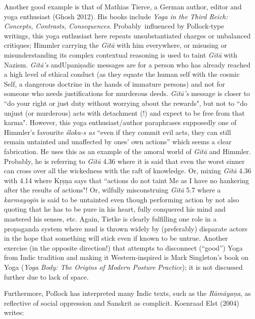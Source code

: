 Another good example is that of Mathias Tierce, a German author, editor and yoga enthusiast (Ghosh 2012). His books include {\sl Yoga in the Third Reich: Concepts, Contrasts, Consequences}. Probably~influenced by Pollock-type writings, this yoga enthusiast here repeats unsubstantiated charges or unbalanced critiques; Himmler carrying the {\sl Gītā} with him everywhere, or misusing or misunderstanding its complex contextual reasoning is used to taint {\sl Gītā} with Nazism. {\sl Gītā's} and\break Upaniṣadic messages are for a person who has already reached a high level of ethical conduct (as they equate the human self with the cosmic Self, a dangerous doctrine in the hands of immature persons) and not for someone who needs justifications for murderous deeds. {\sl Gītā's} message is closer to ``do your right or just duty without worrying about the rewards", but not to ``do unjust (or murderous) acts with detachment (!) and expect to be free from that karma". However, this yoga enthusiast/author paraphrases supposedly one of Himmler's favourite {\sl śloka-s as} ``even if they commit evil acts, they can still remain untainted and unaffected by ones' own actions” which seems a clear fabrication. He uses this as an example of the amoral world of {\sl Gītā} and Himmler. Probably, he is referring to {\sl Gītā} 4.36 where it is said that even the worst sinner can cross over all the wickedness with the raft of knowledge. Or, mixing {\sl Gītā} 4.36 with 4.14 where Kṛṣṇa says that ``actions do not taint Me as I have no hankering after the results of actions"! Or, wilfully misconstruing {\sl Gītā} 5.7 where a {\sl karmayogin} is said to be untainted even though performing action by not also quoting that he has to be pure in his heart, fully conquered his mind and mastered his senses, etc. Again, Tietke is clearly fulfilling one role in a propaganda system where mud is thrown widely by (preferably) disparate actors in the hope that something will stick even if known to be untrue. Another exercise (in the opposite direction!) that attempts to disconnect (“good”) Yoga from Indic tradition and making it Western-inspired is Mark Singleton’s book on Yoga ({\sl Yoga Body: The Origins of Modern Posture Practice}); it is not discussed further due to lack of space.

Furthermore, Pollock has interpreted many Indic texts, such as the {\sl Rāmāyaṇa}, as reflective of social oppression and Sanskrit as complicit. Koenraad Elst (2004) writes: 

